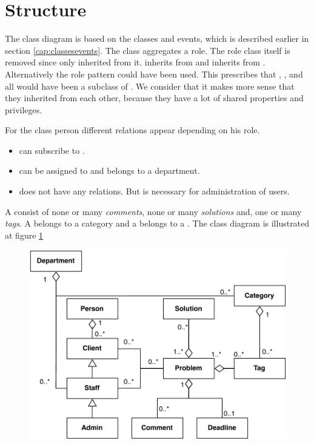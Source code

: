 \section{Structure}
\label{sec:problem_structure}
The class diagram is based on the classes and events, which is described earlier in section \ref{cap:classesevents}. The class  aggregates a role. The role class itself is removed since only \class{\client[]} inherited from it. \class{\staff[c]} inherits from \class{\client[]} and \class{\admin[]} inherits from \cl{\staff[]}. Alternatively the role pattern could have been used. This prescribes that \class{\client[]}, \class{\staff[]}, and \class{\admin[]} all would have been a subclass of \textit{}  \cite[p. 80]{roedeaalborg}. We consider that it makes more sense that they inherited from each other, because they have a lot of shared properties and privileges.

For the class person different relations appear depending on his role. 
\begin{itemize}
\item {} can subscribe to .
\item \class{\staff[c]} can be assigned to  and \class{\staff[]} belongs to a department. 
\item \class{\admin[c]} does not have any relations. But is necessary for administration of users.  
\end{itemize}

A \problem[] consist of none or many \textit{comments}, none or many \textit{solutions} and, one or many \textit{tags}. A  belongs to a category and a  belongs to a .  The class diagram is illustrated at figure \ref{fig:pdaclassdiagram}

\begin{figure}
\begin{center}
\includegraphics[scale=0.6]{input/problem_domain_analysis/newest_class_diagram.pdf}
\label{fig:pdaclassdiagram}
\end{center}
\end{figure}